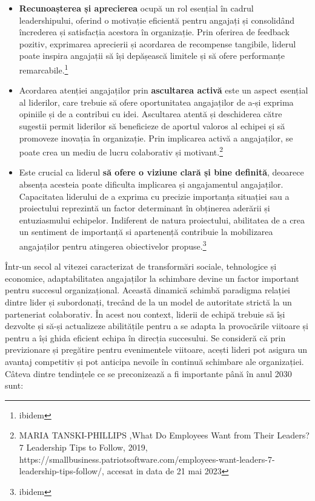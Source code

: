 \documentclass[a4paper, 12pt]{article}
\begin{document}
\begin{itemize}
	\item\textbf{Recunoașterea și aprecierea} ocupă un rol esențial în cadrul leadershipului, oferind o motivație eficientă pentru angajați și consolidând încrederea și satisfacția acestora în organizație. Prin oferirea de feedback pozitiv, exprimarea aprecierii și acordarea de recompense tangibile, liderul poate inspira angajații să își depășească limitele și să ofere performanțe remarcabile.\footnote{ibidem}

		\item Acordarea atenției angajaților prin \textbf {ascultarea activă} este un aspect esențial al liderilor, care trebuie să ofere oportunitatea angajaților de a-și exprima opiniile și de a contribui cu idei. Ascultarea atentă și deschiderea către sugestii permit liderilor să beneficieze de aportul valoros al echipei și să promoveze inovația în organizație. Prin implicarea activă a angajaților, se poate crea un mediu de lucru colaborativ și motivant.\footnote{MARIA TANSKI-PHILLIPS ,What Do Employees Want from Their Leaders? 7 Leadership Tips to Follow, 2019, https://smallbusiness.patriotsoftware.com/employees-want-leaders-7-leadership-tips-follow/, accesat in data de 21 mai 2023}
	

	\item Este crucial ca liderul \textbf{ să ofere o viziune clară și bine definită}, deoarece absența acesteia poate dificulta implicarea și angajamentul angajaților. Capacitatea liderului de a exprima cu precizie importanța situației sau a proiectului reprezintă un factor determinant în obținerea aderării și entuziasmului echipelor. Indiferent de natura proiectului, abilitatea de a crea un sentiment de importanță si apartenență contribuie la mobilizarea angajaților pentru atingerea obiectivelor propuse.\footnote{ibidem}

	\end{itemize}

	\quad\quad Într-un secol al vitezei caracterizat de transformări sociale, tehnologice și economice, adaptabilitatea angajaților la schimbare devine un factor important pentru succesul organizațional. Această dinamică schimbă paradigma relației dintre lider și subordonați, trecând de la un model de autoritate strictă la un parteneriat colaborativ. În acest nou context, liderii de echipă trebuie să își dezvolte și să-și actualizeze abilitățile pentru a se adapta la provocările viitoare și pentru a își ghida eficient echipa în direcția succesului. Se consideră că prin previzionare și pregătire pentru evenimentele viitoare, acești lideri pot asigura un avantaj competitiv și pot anticipa nevoile în continuă schimbare ale organizației. Câteva dintre tendințele ce se preconizează a fi importante până în anul 2030 sunt:
\end{document}
